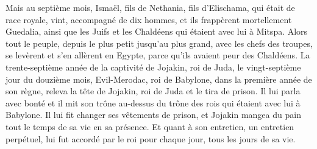 \begin{multicols}{2}
Mais au septième mois, Ismaël, fils de Nethania, fils d'Elischama, qui était de race royale, vint, accompagné de dix hommes, et ils frappèrent mortellement Guedalia, ainsi que les Juifs et les Chaldéens qui étaient avec lui à Mitspa.
Alors tout le peuple, depuis le plus petit jusqu'au plus grand, avec les chefs des troupes, se levèrent et s'en allèrent en Egypte, parce qu'ils avaient peur des Chaldéens.
La trente-septième année de la captivité de Jojakin, roi de Juda, le vingt-septième jour du douzième mois, Evil-Merodac, roi de Babylone, dans la première année de son règne, releva la tête de Jojakin, roi de Juda et le tira de prison.
Il lui parla avec bonté et il mit son trône au-dessus du trône des rois qui étaient avec lui à Babylone.
Il lui fit changer ses vêtements de prison, et Jojakin mangea du pain tout le temps de sa vie en sa présence.
Et quant à son entretien, un entretien perpétuel, lui fut accordé par le roi pour chaque jour, tous les jours de sa vie.
\PPE{}
\end{multicols}
